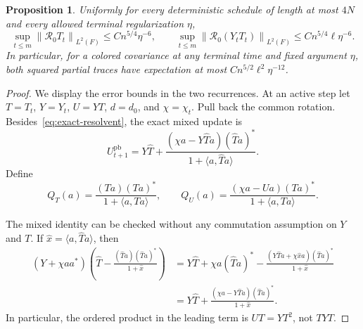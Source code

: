 \documentclass[11pt]{article}
\newtheorem{proposition}[theorem]{Proposition}
\theoremstyle{definition}\newtheorem{definition}[theorem]{Definition}
\theoremstyle{remark}\newtheorem{remark}[theorem]{Remark}
\newcommand{\R}{\mathcal R}
\newcommand{\ip}[2]{\langle#1,#2\rangle}
\newcommand{\norm}[1]{\left\lVert#1\right\rVert}
\begin{document}
\begin{proposition}\label{prop:partial-resolvent}
Uniformly for every deterministic schedule of length at most $4N$ and every allowed terminal regularization $\eta$,
\begin{equation}\label{eq:partial-resolvent}
 \sup_{t\le m}\norm{\R_0T_t}_{L^2(F)}
 \le Cn^{5/4}\eta^{-6},\qquad
 \sup_{t\le m}\norm{\R_0(Y_tT_t)}_{L^2(F)}
 \le Cn^{5/4}\ell\eta^{-6}.
\end{equation}
In particular, for a colored covariance at any terminal time and fixed argument $\eta$, both squared partial traces have expectation at most
$Cn^{5/2}\ell^2\eta^{-12}$.
\end{proposition}
\begin{proof}
We display the error bounds in the two recurrences. At an active step let $T=T_t$, $Y=Y_t$, $U=YT$, $d=d_0$, and $\chi=\chi_t$. Pull back the common rotation. Besides~\eqref{eq:exact-resolvent}, the exact mixed update is
\begin{equation}\label{eq:mixed-exact}
 U_{t+1}^{\mathrm{pb}}
 =Y\widehat T+
   \frac{(\chi a-Y\widehat T a)(\widehat T a)^*}
        {1+\ip a{\widehat T a}}.
\end{equation}
Define
\[
 Q_T(a)=\frac{(Ta)(Ta)^*}{1+\ip a{Ta}},\qquad
 Q_U(a)=\frac{(\chi a-Ua)(Ta)^*}{1+\ip a{Ta}}.
\]

The mixed identity can be checked without any commutation assumption on $Y$ and $T$. If $\widehat x=\langle a,\widehat Ta\rangle$, then
\begin{align*}
 (Y+\chi aa^*)\left(\widehat T-
 \frac{(\widehat Ta)(\widehat Ta)^*}{1+\widehat x}\right)
 &=Y\widehat T+\chi a(\widehat Ta)^*
   -\frac{(Y\widehat Ta+\chi\widehat x a)(\widehat Ta)^*}{1+\widehat x}\\
 &=Y\widehat T+
   \frac{(\chi a-Y\widehat Ta)(\widehat Ta)^*}{1+\widehat x}.
\end{align*}
In particular, the ordered product in the leading term is $UT=YT^2$, not $TYT$.


\end{proof}
\end{document}
